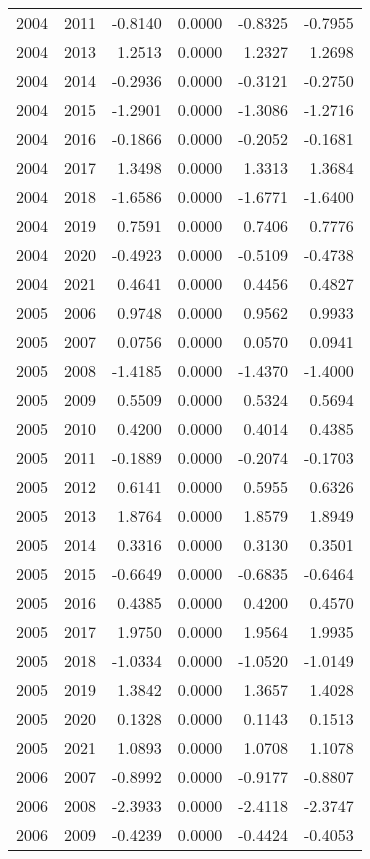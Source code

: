 \begin{tabular}{llrrrr}
2004 & 2011 & -0.8140 & 0.0000 & -0.8325 & -0.7955 \\
2004 & 2013 & 1.2513 & 0.0000 & 1.2327 & 1.2698 \\
2004 & 2014 & -0.2936 & 0.0000 & -0.3121 & -0.2750 \\
2004 & 2015 & -1.2901 & 0.0000 & -1.3086 & -1.2716 \\
2004 & 2016 & -0.1866 & 0.0000 & -0.2052 & -0.1681 \\
2004 & 2017 & 1.3498 & 0.0000 & 1.3313 & 1.3684 \\
2004 & 2018 & -1.6586 & 0.0000 & -1.6771 & -1.6400 \\
2004 & 2019 & 0.7591 & 0.0000 & 0.7406 & 0.7776 \\
2004 & 2020 & -0.4923 & 0.0000 & -0.5109 & -0.4738 \\
2004 & 2021 & 0.4641 & 0.0000 & 0.4456 & 0.4827 \\
2005 & 2006 & 0.9748 & 0.0000 & 0.9562 & 0.9933 \\
2005 & 2007 & 0.0756 & 0.0000 & 0.0570 & 0.0941 \\
2005 & 2008 & -1.4185 & 0.0000 & -1.4370 & -1.4000 \\
2005 & 2009 & 0.5509 & 0.0000 & 0.5324 & 0.5694 \\
2005 & 2010 & 0.4200 & 0.0000 & 0.4014 & 0.4385 \\
2005 & 2011 & -0.1889 & 0.0000 & -0.2074 & -0.1703 \\
2005 & 2012 & 0.6141 & 0.0000 & 0.5955 & 0.6326 \\
2005 & 2013 & 1.8764 & 0.0000 & 1.8579 & 1.8949 \\
2005 & 2014 & 0.3316 & 0.0000 & 0.3130 & 0.3501 \\
2005 & 2015 & -0.6649 & 0.0000 & -0.6835 & -0.6464 \\
2005 & 2016 & 0.4385 & 0.0000 & 0.4200 & 0.4570 \\
2005 & 2017 & 1.9750 & 0.0000 & 1.9564 & 1.9935 \\
2005 & 2018 & -1.0334 & 0.0000 & -1.0520 & -1.0149 \\
2005 & 2019 & 1.3842 & 0.0000 & 1.3657 & 1.4028 \\
2005 & 2020 & 0.1328 & 0.0000 & 0.1143 & 0.1513 \\
2005 & 2021 & 1.0893 & 0.0000 & 1.0708 & 1.1078 \\
2006 & 2007 & -0.8992 & 0.0000 & -0.9177 & -0.8807 \\
2006 & 2008 & -2.3933 & 0.0000 & -2.4118 & -2.3747 \\
2006 & 2009 & -0.4239 & 0.0000 & -0.4424 & -0.4053 \\

\end{tabular}
